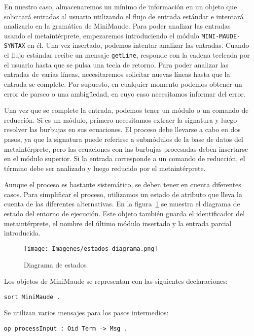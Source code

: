En nuestro caso, almacenaremos un mínimo de información en un objeto que solicitará entradas al usuario utilizando el flujo de entrada estándar e intentará analizarlo en la gramática de MiniMaude. Para poder analizar las entradas usando el metaintérprete, empezaremos introduciendo el módulo \texttt{MINI-MAUDE-SYNTAX} en él. Una vez insertado, podemos intentar analizar las entradas. Cuando el flujo estándar recibe un mensaje \texttt{getLine}, responde con la cadena tecleada por el usuario hasta que se pulsa una tecla de retorno. Para poder analizar las entradas de varias líneas, necesitaremos solicitar nuevas líneas hasta que la entrada se complete. Por supuesto, en cualquier momento podemos obtener un error de parseo o una ambigüedad, en cuyo caso necesitamos informar del error.
\medskip

Una vez que se complete la entrada, podemos tener un módulo o un comando de reducción. Si es un módulo, primero necesitamos extraer la signatura y luego resolver las burbujas en sus ecuaciones. El proceso debe llevarse a cabo en dos pasos, ya que la signatura puede referirse a submódulos de la base de datos del metaintérprete, pero las ecuaciones con las burbujas procesadas deben insertarse en el módulo superior. Si la entrada corresponde a un comando de reducción, el término debe ser analizado y luego reducido por el metaintérprete.

Aunque el proceso es bastante sistemático, se deben tener en cuenta diferentes casos. Para simplificar el proceso, utilizamos un estado de atributo que lleva la cuenta de las diferentes alternativas. En la figura~\ref{fig:estados} se muestra el diagrama de estado del entorno de ejecución. Este objeto también guarda el identificador del metaintérprete, el nombre del último módulo insertado y la entrada parcial introducida.
\medskip

\begin{figure}[h]
	\centering
	\texttt{[image: Imagenes/estados-diagrama.png]}
	\caption{Diagrama de estados}
	\label{fig:estados}
\end{figure}


Los objetos de MiniMaude se representan con las siguientes declaraciones:

\begin{lstlisting}[language=Maude]
	sort MiniMaude .
\end{lstlisting}
\medskip

Se utilizan varios mensajes para los pasos intermedios:

\begin{lstlisting}[language=Maude]
   op processInput : Oid Term -> Msg .
\end{lstlisting}
\medskip

